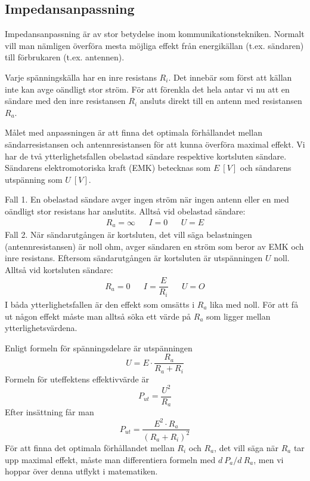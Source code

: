 \subsection{Impedansanpassning}

Impedansanpassning är av stor betydelse inom kommunikationstekniken.
Normalt vill man nämligen överföra mesta möjliga effekt från energikällan
(t.ex. sändaren) till förbrukaren (t.ex. antennen).

Varje spänningskälla har en inre resistans \(R_i\). Det innebär som först att
källan inte kan avge oändligt stor ström.
För att förenkla det hela antar vi nu att en sändare med den inre resistansen
\(R_i\) ansluts direkt till en antenn med resistansen \(R_a\).

Målet med anpassningen är att finna det optimala förhållandet mellan
sändarresistansen och antennresistansen för att kunna överföra maximal effekt.
Vi har de två ytterlighetsfallen obelastad sändare respektive kortsluten
sändare.
Sändarens elektromotoriska kraft (EMK) betecknas som \(E\ [V]\) och sändarens
utspänning som \(U\ [V]\).

Fall 1.
En obelastad sändare avger ingen ström när ingen antenn eller en med oändligt
stor resistans har anslutits.
Alltså vid obelastad sändare:
\[
\begin{array}{lllll}
R_a = \infty & & I = 0 & & U = E
\end{array}
\]
Fall 2.
När sändarutgången är kortsluten, det vill säga belastningen
(antennresistansen) är noll ohm, avger sändaren en ström som beror av EMK och
inre resistans.
Eftersom sändarutgången är kortsluten är utspänningen \(U\) noll.
Alltså vid kortsluten sändare:
\[
\begin{array}{lllll}
R_a = 0 & & I = \dfrac{E}{R_i} & & U = O
\end{array}
\]
I båda ytterlighetsfallen är den effekt som omsätts i \(R_a\) lika med noll.
För att få ut någon effekt måste man alltså söka ett värde på \(R_a\) som
ligger mellan ytterlighetsvärdena.

Enligt formeln för spänningsdelare är utspänningen
\[U = E \cdot \dfrac{R_a}{R_a+R_i}\]
Formeln för uteffektens effektivvärde är
\[P_{ut} = \dfrac{U^2}{R_a}\]
Efter insättning får man
\[P_{ut} = \dfrac{E^2 \cdot R_a}{(R_a + R_i)^2}\]
För att finna det optimala förhållandet mellan \(R_i\) och \(R_a\), det vill
säga när \(R_a\) tar upp maximal effekt, måste man differentiera formeln med
\(d\ P_a/d\ R_a\), men vi hoppar över denna utflykt i matematiken.

